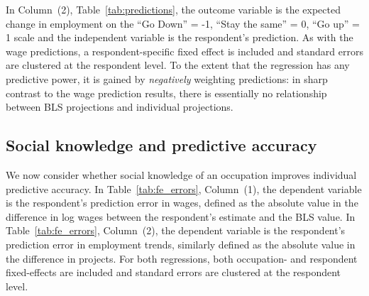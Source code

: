 \documentclass[12pt]{article}
\begin{document}
In Column~(2), Table~\ref{tab:predictions}, the outcome variable is the expected change in employment on the ``Go Down'' = -1, ``Stay the same'' = 0, ``Go up'' = 1 scale and the independent variable is the respondent's prediction. 
As with the wage predictions, a respondent-specific fixed effect is included and standard errors are clustered at the respondent level. 
To the extent that the regression has any predictive power, it is gained by \emph{negatively} weighting predictions:
in sharp contrast to the wage prediction results, there is essentially no relationship between BLS projections and individual projections. 




\subsection{Social knowledge and predictive accuracy}

We now consider whether social knowledge of an occupation improves individual predictive accuracy. 
In Table~\ref{tab:fe_errors}, Column~(1), the dependent variable is the respondent's prediction error in wages, defined as the absolute value in the difference in log wages between the respondent's estimate and the BLS value.  
In Table~\ref{tab:fe_errors}, Column~(2), the dependent variable is the respondent's prediction error in employment trends, similarly defined as the absolute value in the difference in projects. 
For both regressions, both occupation- and respondent fixed-effects are included and standard errors are clustered at the respondent level.  


\end{document}
